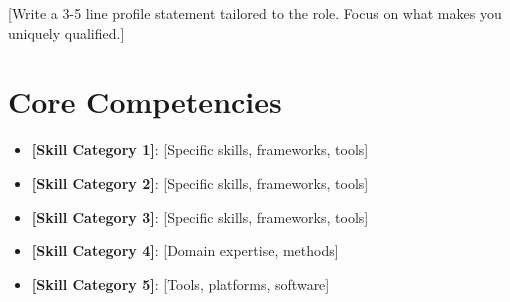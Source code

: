 \documentclass[11pt,a4paper,sans]{moderncv}
\begin{document}
\makecvtitle


\vspace{6pt}
\small{[Write a 3-5 line profile statement tailored to the role. Focus on what makes you uniquely qualified.]}


\section{Core Competencies}
\vspace{1pt}
\begin{itemize}
\item \textbf{[Skill Category 1]}: [Specific skills, frameworks, tools]
\item \textbf{[Skill Category 2]}: [Specific skills, frameworks, tools]
\item \textbf{[Skill Category 3]}: [Specific skills, frameworks, tools]
\item \textbf{[Skill Category 4]}: [Domain expertise, methods]
\item \textbf{[Skill Category 5]}: [Tools, platforms, software]
\end{itemize}

\end{document}

